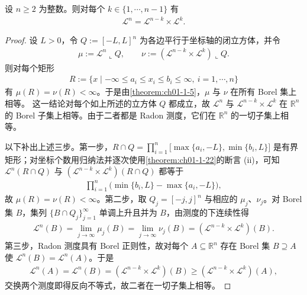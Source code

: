 \documentclass[../../main.tex]{subfiles}%
\begin{document}
\begin{theorem}\label{theorem:ch01-1-23}
设 $n\geqslant2$ 为整数。则对每个 $k\in\{1,\cdots,n-1\}$ 有
\begin{align*}
\mathcal{L}^n=\mathcal{L}^{n-k}\times\mathcal{L}^k.
\end{align*}
\end{theorem}

\begin{proof}
设 $L>0$，令 $Q:=[-L,L]^n$ 为各边平行于坐标轴的闭立方体，并令
\begin{align*}
\mu:=\mathcal{L}^n\llcorner Q,\qquad \nu:=(\mathcal{L}^{n-k}\times\mathcal{L}^k)\llcorner Q.
\end{align*}
则对每个矩形
\begin{align*}
R:=\{x\mid -\infty\leqslant a_i\leqslant x_i\leqslant b_i\leqslant\infty,\ i=1,\cdots,n\}
\end{align*}
有 $\mu(R)=\nu(R)<\infty$。于是由\cref{theorem:ch01-1-5}，$\mu$ 与 $\nu$ 在所有 Borel 集上相等。%
这一结论对每个如上所述的立方体 $Q$ 都成立，故 $\mathcal{L}^n$ 与 $\mathcal{L}^{n-k}\times\mathcal{L}^k$ 在 $\mathbb{R}^n$ 的 Borel 子集上相等。由于二者都是 Radon 测度，它们在 $\mathbb{R}^n$ 的一切子集上相等。

以下补出上述三步。第一步，$R\cap Q=\prod_{i=1}^{n}\bigl[\max\{a_i,-L\},\min\{b_i,L\}\bigr]$ 是有界矩形；对坐标个数用归纳法并逐次使用\cref{theorem:ch01-1-22}的断言 (ii)，可知 $\mathcal{L}^n(R\cap Q)$ 与 $(\mathcal{L}^{n-k}\times\mathcal{L}^k)(R\cap Q)$ 都等于%
\begin{align*}
\prod_{i=1}^{n}\bigl(\min\{b_i,L\}-\max\{a_i,-L\}\bigr),
\end{align*}
故 $\mu(R)=\nu(R)<\infty$。第二步，取 $Q_j=[-j,j]^n$ 与相应的 $\mu_j$、$\nu_j$。对 Borel 集 $B$，集列 $\{B\cap Q_j\}_{j=1}^{\infty}$ 单调上升且并为 $B$，由测度的下连续性得
\begin{align*}
\mathcal{L}^n(B)=\lim_{j\to\infty}\mu_j(B)=\lim_{j\to\infty}\nu_j(B)=(\mathcal{L}^{n-k}\times\mathcal{L}^k)(B).
\end{align*}
第三步，Radon 测度具有 Borel 正则性，故对每个 $A\subseteq\mathbb{R}^n$ 存在 Borel 集 $B\supseteq A$ 使 $\mathcal{L}^n(B)=\mathcal{L}^n(A)$。于是
\begin{align*}
\mathcal{L}^n(A)=\mathcal{L}^n(B)=(\mathcal{L}^{n-k}\times\mathcal{L}^k)(B)\geqslant(\mathcal{L}^{n-k}\times\mathcal{L}^k)(A),
\end{align*}
交换两个测度即得反向不等式，故二者在一切子集上相等。
\end{proof}
\end{document}
